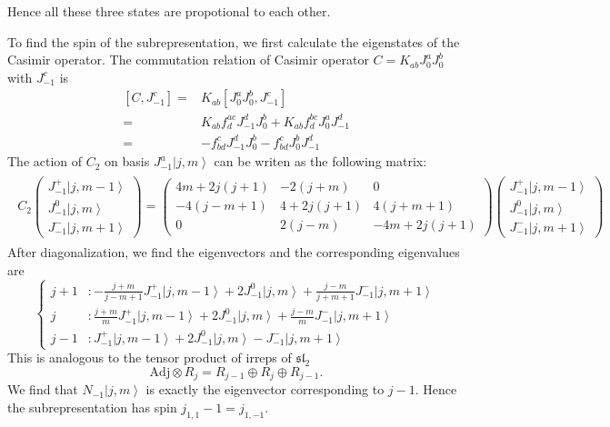 \documentclass[10pt,a4paper]{article}
\numberwithin{equation}{section}
\newcommand{\ket}[1]{\left| #1 \right\rangle}
\begin{document}
Hence all these three states are propotional to each other. 
\par To find the spin of the subrepresentation, we first calculate the eigenstates of the Casimir operator.
The commutation relation of Casimir operator $C = K_{ab} J^{a}_{0} J^{b}_{0}$ with $J^{c}_{-1}$ is 
\begin{equation}
    \begin{aligned}
        \left[C,J^{c}_{-1}\right] = & K_{ab}\left[J^{a}_{0}J^{b}_{0},J^{c}_{-1}\right]\\
        =& K_{ab}f^{ac}_{d}J^{d}_{-1}J^{b}_{0} + K_{ab}f^{bc}_{d}J^{a}_{0}J^{d}_{-1}\\
        =& -f^{c}_{bd} J^{d}_{-1}J^{b}_{0} - f^{c}_{bd}J^{b}_{0}J^{d}_{-1}
    \end{aligned}
\end{equation}
The action of $C_{2}$ on basis $J^{a}_{-1} \ket{j,m}$ can be writen as the following matrix:
\begin{eqnarray}
    \begin{aligned}
        C_{2} 
    \begin{pmatrix}
    J^{+}_{-1} \ket{j,m-1}\\
    J^{0}_{-1} \ket{j,m}\\
    J^{-}_{-1} \ket{j,m+1}
    \end{pmatrix}
    = \begin{pmatrix}
        4m+2j(j+1) & -2 (j+m) & 0\\
         -4 (j-m+1) & 4 + 2j(j+1) & 4(j+m+1)\\
        0 & 2 (j-m)& -4m + 2j(j+1)
    \end{pmatrix}
    \begin{pmatrix}
        J^{+}_{-1} \ket{j,m-1}\\
        J^{0}_{-1} \ket{j,m}\\
        J^{-}_{-1} \ket{j,m+1}
    \end{pmatrix}
    \end{aligned}
\end{eqnarray}
After diagonalization, we find the eigenvectors and the corresponding eigenvalues are 
\begin{equation}
    \left\{
        \begin{aligned}
            j+1 &: -\frac{j+m}{j-m+1} J^{+}_{-1} \ket{j,m-1} + 2 J^{0}_{-1} \ket{j,m} + \frac{j-m}{j+m+1} J^{-}_{-1} \ket{j,m+1}\\
            j &: \frac{j+m}{m} J^{+}_{-1} \ket{j,m-1} + 2 J^{0}_{-1} \ket{j,m} + \frac{j-m}{m} J^{-}_{-1} \ket{j,m+1}\\
            j-1 &: J^{+}_{-1} \ket{j,m-1} + 2 J^{0}_{-1} \ket{j,m} - J^{-}_{-1} \ket{j,m+1}
        \end{aligned}
    \right.
\end{equation}
This is analogous to the tensor product of irreps of $\mathfrak{sl}_{2}$
\begin{equation}
    \mathrm{Adj} \otimes R_{j} = R_{j-1} \oplus R_{j} \oplus R_{j-1}.
\end{equation}
We find that $N_{-1}\ket{j,m}$ is exactly the eigenvector corresponding to $j-1$. Hence the subrepresentation has spin $j_{1,1}-1 = j_{1,-1}$.

\printbibliography 
\end{document}
